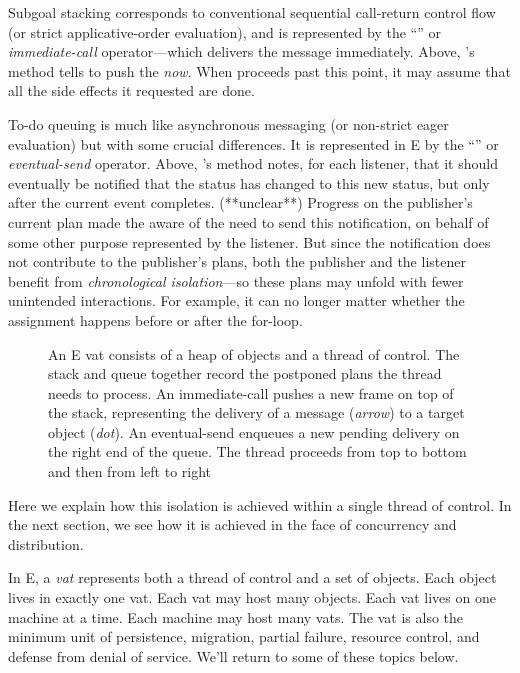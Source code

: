 \documentclass{llncs}
\begin{document}
Subgoal stacking corresponds to conventional sequential call-return
control flow (or strict applicative-order evaluation), and is
represented by the ``'' or \emph{immediate-call}
operator---which delivers the message immediately. Above,
's  method tells
 to push the  \emph{now}. When
 proceeds past this point, it may assume that all
the side effects it requested are done.

To-do queuing is much like asynchronous messaging (or non-strict eager
evaluation) but with some crucial differences. It is represented in E
by the ``\code{<-}'' or \emph{eventual-send} operator. Above,
's  method notes, for each
listener, that it should eventually be notified that the status has
changed to this new status, but only after the current event
completes. (**unclear**) Progress on the publisher's current plan made
the  aware of the need to send this notification,
on behalf of some other purpose represented by the listener. But since
the notification does not contribute to the publisher's plans, both
the publisher and the listener benefit from \emph{chronological
isolation}---so these plans may unfold with fewer unintended
interactions. For example, it can no longer matter whether the
assignment happens before or after the for-loop.
%
\begin{figure}
\centerline{}
\caption{An E vat consists of a heap of objects and a thread of
  control. The stack and queue together record the postponed plans the
  thread needs to process. An immediate-call pushes a new frame on top
  of the stack, representing the delivery of a message ({\it arrow})
  to a target object ({\it dot}). An eventual-send enqueues a new
  pending delivery on the right end of the queue. The thread proceeds
  from top to bottom and then from left to right}
\label{fig:stackvat}
\end{figure}
%
Here we explain how this isolation is achieved within a single thread
of control. In the next section, we see how it is achieved in the face
of concurrency and distribution.

In E, a \emph{vat} represents both a thread of control and a set of
objects. Each object lives in exactly one vat. Each vat may host many
objects. Each vat lives on one machine at a time. Each machine may
host many vats. The vat is also the minimum unit of persistence,
migration, partial failure, resource control, and defense from denial
of service. We'll return to some of these topics below.
\end{document}
